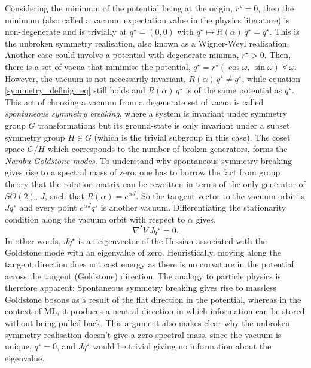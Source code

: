 \documentclass{article}
\begin{document}
Considering the minimum of the potential being at the origin, $r^\star = 0$, then the minimum (also called a vacuum expectation value in the physics literature) is non-degenerate and is trivially at $q^\star=(0,0)$ with $q^\star \mapsto R(\alpha)\, q^\star = q^\star$. This is the unbroken symmetry realisation, also known as a Wigner-Weyl realisation. Another case could involve a potential with degenerate minima, $r^\star > 0$. Then, there is a set of vacua that minimise the potential, $q^\star=r^\star (\cos \omega,\, \sin \omega )\; \forall\, \omega$. However, the vacuum is not necessarily invariant, $R(\alpha)\, q^\star \neq q^\star$, while equation \ref{symmetry_definig_eq} still holds and $R(\alpha)\, q^\star$ is of the same potential as $q^\star$. This act of choosing a vacuum from a degenerate set of vacua is called \textit{spontaneous symmetry breaking}, where a system is invariant under symmetry group $G$ transformations but its ground-state is only invariant under a subset symmetry group $H \in G$ (which is the trivial subgroup in this case). The coset space $G/H$ which corresponds to the number of broken generators, forms the \textit{Nambu-Goldstone modes}. To understand why spontaneous symmetry breaking gives rise to a spectral mass of zero, one has to borrow the fact from group theory that the rotation matrix can be rewritten in terms of the only generator of $SO(2)$, $J$, such that $R(\alpha)= e^{\alpha J}$. So the tangent vector to the vacuum orbit is $Jq^\star$ and every point $e^{\alpha J}q^\star$ is another vacuum. Differentiating the stationarity condition along the vacuum orbit with respect to $\alpha$ gives,
\begin{equation}
\nabla^2 V\, Jq^\star= 0.
\end{equation}
In other words, $Jq^\star$ is an eigenvector of the Hessian associated with the Goldstone mode with an eigenvalue of zero. Heuristically, moving along the tangent direction does not cost energy as there is no curvature in the potential across the tangent (Goldstone) direction. The analogy to particle physics is therefore apparent: Spontaneous symmetry breaking gives rise to massless Goldstone bosons as a result of the flat direction in the potential, whereas in the context of ML, it produces a neutral direction in which information can be stored without being pulled back. This argument also makes clear why the unbroken symmetry realisation doesn't give a zero spectral mass, since the vacuum is unique, $q^\star=0$, and $Jq^\star$ would be trivial giving no information about the eigenvalue.
\end{document}
